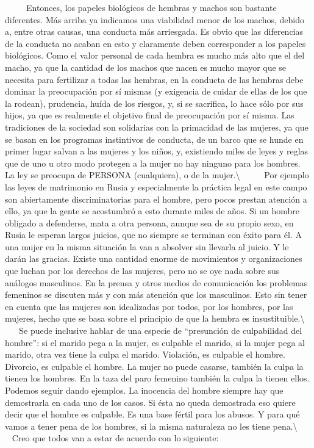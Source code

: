 ~ ~ ~ Entonces, los papeles biológicos de hembras y machos son bastante
diferentes. Más arriba ya indicamos una viabilidad menor de los machos,
debido a, entre otras causas, una conducta más arriesgada. Es obvio que
las diferencias de la conducta no acaban en esto y claramente deben
corresponder a los papeles biológicos. Como el valor personal de cada
hembra es mucho más alto que el del macho, ya que la cantidad de los
machos que nacen es mucho mayor que se necesita para fertilizar a todas
las hembras, en la conducta de las hembras debe dominar la preocupación
por sí mismas (y exigencia de cuidar de ellas de los que la rodean),
prudencia, huída de los riesgos, y, si se sacrifica, lo hace sólo por
sus hijos, ya que es realmente el objetivo final de preocupación por sí
misma. Las tradiciones de la sociedad son solidarias con la primacidad
de las mujeres, ya que se basan en los programas instintivos de
conducta, de un barco que se hunde en primer lugar salvan a las mujeres
y los niños, y, existiendo miles de leyes y reglas que de uno u otro
modo protegen a la mujer no hay ninguno para los hombres. La ley se
preocupa de PERSONA (cualquiera), o de la mujer.\textbackslash{} ~ ~ ~
Por ejemplo las leyes de matrimonio en Rusia y especialmente la práctica
legal en este campo son abiertamente discriminatorias para el hombre,
pero pocos prestan atención a ello, ya que la gente se acostumbró a esto
durante miles de años. Si un hombre obligado a defenderse, mata a otra
persona, aunque sea de su propio sexo, en Rusia le esperan largos
juicios, que no siempre se terminan con éxito para él. A una mujer en la
misma situación la van a absolver sin llevarla al juicio. Y le darán las
gracias. Existe una cantidad enorme de movimientos y organizaciones que
luchan por los derechos de las mujeres, pero no se oye nada sobre sus
análogos masculinos. En la prensa y otros medios de comunicación los
problemas femeninos se discuten más y con más atención que los
masculinos. Esto sin tener en cuenta que las mujeres son idealizadas por
todos, por los hombres, por las mujeres, hecho que se basa sobre el
principio de que la hembra es insustituible.\textbackslash{} ~ ~ ~ Se
puede inclusive hablar de una especie de ``presunción de culpabilidad
del hombre'': si el marido pega a la mujer, es culpable el marido, si la
mujer pega al marido, otra vez tiene la culpa el marido. Violación, es
culpable el hombre. Divorcio, es culpable el hombre. La mujer no puede
casarse, también la culpa la tienen los hombres. En la taza del paro
femenino también la culpa la tienen ellos. Podemos seguir dando
ejemplos. La inocencia del hombre siempre hay que demostrarla en cada
uno de los casos. Si ésta no queda demostrada eso quiere decir que el
hombre es culpable. Es una base fértil para los abusos. Y para qué vamos
a tener pena de los hombres, si la misma naturaleza no les tiene
pena.\textbackslash{} ~ ~ ~ Creo que todos van a estar de acuerdo con lo
siguiente:

